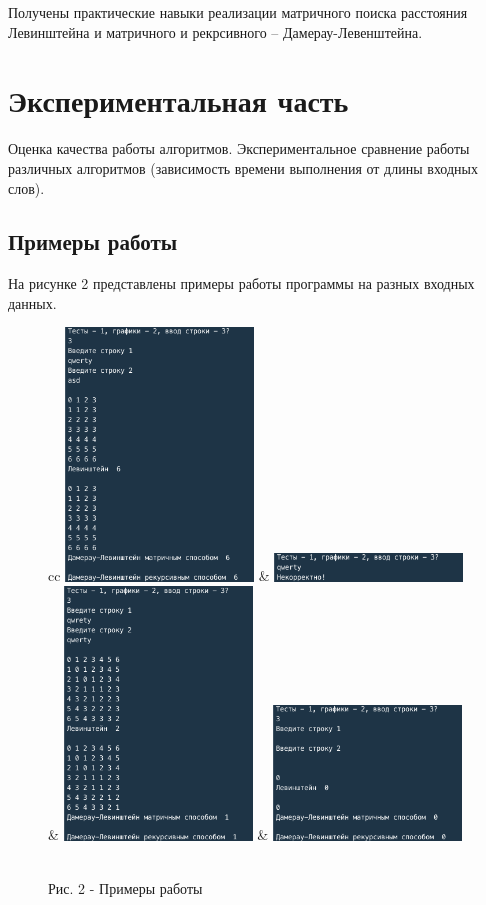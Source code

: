 \documentclass[a4paper,14pt]{article} %
\begin{document}
        Получены практические навыки реализации матричного поиска расстояния Левинштейна и матричного и рекрсивного -- Дамерау-Левенштейна. 

    \newpage

        \section{Экспериментальная часть}
        \hfill
        
        Оценка качества работы алгоритмов. Экспериментальное сравнение работы различных алгоритмов (зависимость времени выполнения от длины входных слов). 
        
        \subsection{Примеры работы}
	\hfill
	
	На рисунке 2 представлены примеры работы программы на разных входных данных. 
	\begin{figure}[ht]\center
		\begin{tabular}{cc}
			\includegraphics[width=50mm]{ex1} & \includegraphics[width=50mm]{ex2} & 
			\includegraphics[width=50mm]{ex3} & \includegraphics[width=50mm]{ex4}
		\end{tabular}
		\\ Рис. 2 - Примеры работы
	\end{figure}
        
\end{document}

